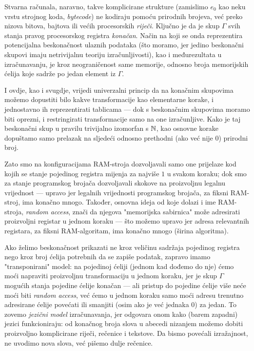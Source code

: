 Stvarna računala, naravno, takve komplicirane strukture (zamislimo $e_0$ kao neku vrstu strojnog koda, \emph{bytecode}) ne kodiraju pomoću prirodnih brojeva, već preko nizova bitova, bajtova ili većih procesorskih \emph{riječi}. Ključno je da je skup $\Gamma$ svih stanja pravog procesorskog registra \emph{konačan}. Način na koji se onda reprezentira potencijalna beskonačnost ulaznih podataka (što moramo, jer jedino beskonačni skupovi imaju netrivijalnu teoriju izračunljivosti), kao i međurezultata u izračunavanju, je kroz neograničenost same memorije, odnosno broja memorijskih ćelija koje sadrže po jedan element iz $\Gamma$.

I ovdje, kao i svugdje, vrijedi univerzalni princip da na konačnim skupovima možemo dopustiti bilo kakve transformacije kao elementarne korake, i jednostavno ih reprezentirati tablicama --- dok s beskonačnim skupovima moramo biti oprezni, i restringirati transformacije samo na one izračunljive. Kako je taj beskonačni skup u pravilu trivijalno izomorfan s ${\mathbb N}$, kao osnovne korake dopuštamo samo prelazak na sljedeći odnosno prethodni (ako već nije $0$) prirodni broj.

Zato smo na konfiguracijama RAM-stroja dozvoljavali samo one prijelaze kod kojih se stanje pojedinog registra mijenja za najviše $1$ u svakom koraku; dok smo za stanje programskog brojača dozvoljavali skokove na proizvoljnu legalnu vrijednost --- upravo jer legalnih vrijednosti programskog brojača, za fiksni RAM-stroj, ima konačno mnogo. Također, osnovna ideja od koje dolazi i ime RAM-stroja, \emph{random access}, znači da njegova "memorijska sabirnica" može adresirati proizvoljni registar u jednom koraku --- što možemo upravo jer adresa relevantnih registara, za fiksni RAM-algoritam, ima konačno mnogo (širina algoritma).

Ako želimo beskonačnost prikazati ne kroz veličinu sadržaja pojedinog registra nego kroz broj ćelija potrebnih da se zapiše podatak, zapravo imamo "transponirani" model: na pojedinoj ćeliji (jednom kad dođemo do nje) ćemo moći napraviti proizvoljnu transformaciju u jednom koraku, jer je skup $\Gamma$ mogućih stanja pojedine ćelije konačan --- ali pristup do pojedine ćelije više neće moći biti \emph{random access}, već ćemo u jednom koraku samo moći adresu trenutno adresirane ćelije povećati ili smanjiti (osim ako je već jednaka $0$) za jedan. To zovemo \emph{jezični model} izračunavanja, jer odgovara onom kako (barem zapadni) jezici funkcioniraju: od konačnog broja slova u abecedi nizanjem možemo dobiti proizvoljno komplicirane riječi, rečenice i tekstove. Da bismo povećali izražajnost, ne uvodimo nova slova, već pišemo dulje rečenice.


